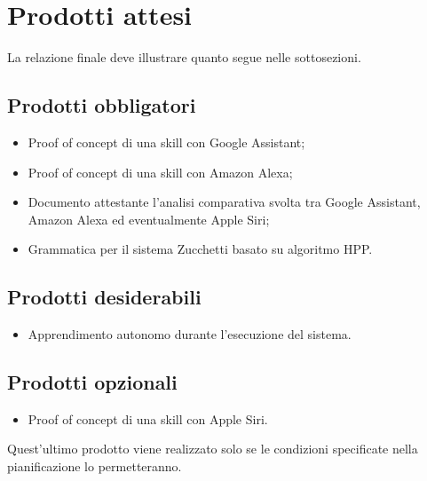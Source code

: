 \section{Prodotti attesi}
La relazione finale deve illustrare quanto segue nelle sottosezioni.
\subsection{Prodotti obbligatori}
\begin{itemize}
    \item Proof of concept di una skill con Google Assistant;
    \item Proof of concept di una skill con Amazon Alexa;
    \item Documento attestante l'analisi comparativa svolta tra Google Assistant, Amazon Alexa ed eventualmente Apple Siri;
    \item Grammatica per il sistema Zucchetti basato su algoritmo HPP.
\end{itemize}
\subsection{Prodotti desiderabili}
\begin{itemize}
	\item Apprendimento autonomo durante l'esecuzione del sistema.
\end{itemize}
\subsection{Prodotti opzionali}
\begin{itemize}
    \item Proof of concept di una skill con Apple Siri.
\end{itemize}
Quest'ultimo prodotto viene realizzato solo se le condizioni specificate nella pianificazione lo permetteranno.
